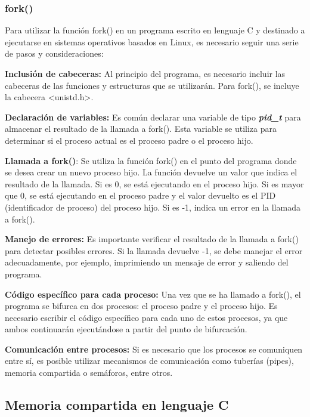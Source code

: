 \subsubsection{fork()}\label{fork}

Para utilizar la función fork() en un programa escrito en lenguaje C y destinado a ejecutarse en sistemas operativos basados en Linux, es necesario seguir una serie de pasos y consideraciones:

\textbf{Inclusión de cabeceras:} Al principio del programa, es necesario incluir las cabeceras de las funciones y estructuras que se utilizarán. Para fork(), se incluye la cabecera \textless unistd.h\textgreater.

\textbf{Declaración de variables:} Es común declarar una variable de tipo \emph{\textbf{pid\_t}} para almacenar el resultado de la llamada a fork(). Esta variable se utiliza para determinar si el proceso actual es el proceso padre o el proceso hijo.

\textbf{Llamada a fork()}: Se utiliza la función fork() en el punto del programa donde se desea crear un nuevo proceso hijo. La función devuelve un valor que indica el resultado de la llamada. Si es 0, se está ejecutando en el proceso hijo. Si es mayor que 0, se está ejecutando en el proceso padre y el valor devuelto es el PID (identificador de proceso) del proceso hijo. Si es -1, indica un error en la llamada a fork().

\textbf{Manejo de errores:} Es importante verificar el resultado de la llamada a fork() para detectar posibles errores. Si la llamada devuelve -1, se debe manejar el error adecuadamente, por ejemplo, imprimiendo un mensaje de error y saliendo del programa.

\textbf{Código específico para cada proceso:} Una vez que se ha llamado a fork(), el programa se bifurca en dos procesos: el proceso padre y el proceso hijo. Es necesario escribir el código específico para cada uno de estos procesos, ya que ambos continuarán ejecutándose a partir del punto de bifurcación.

\textbf{Comunicación entre procesos:} Si es necesario que los procesos se comuniquen entre sí, es posible utilizar mecanismos de comunicación como tuberías (pipes), memoria compartida o semáforos, entre otros.

\subsection{Memoria compartida en lenguaje C}\label{memoria-compartida-en-lenguaje-c}

